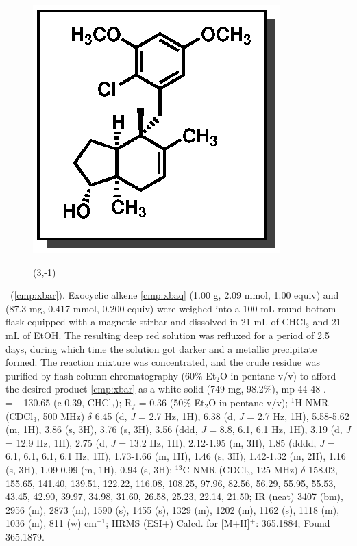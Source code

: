 \vspace{10pt}
\begin{figure}
  \vspace{-25pt}
  \begin{center}
    \includegraphics[scale=0.8]{chp_singlecarbon/images/xbar}
    \begin{textblock}{1}(3,-1)  \end{textblock}
  \end{center}
  \vspace{-30pt}
\end{figure}\noindent \textbf{\CMPxbar}\ (\ref{cmp:xbar}). Exocyclic alkene \ref{cmp:xbaq} (1.00
g, 2.09 mmol, 1.00 equiv) and  (87.3 mg, 0.417 mmol, 0.200 equiv) were
weighed into a 100 mL round bottom flask equipped with a magnetic
stirbar and dissolved in 21 mL of CHCl$_3$ and 21 mL of EtOH. The
resulting deep red solution was refluxed for a period of 2.5 days, during
which time the solution got darker and a metallic precipitate formed. The reaction mixture was
concentrated, and the crude residue was purified by flash column chromatography (60\% Et$_2$O in
pentane v/v) to afford the desired product \ref{cmp:xbar} as a white solid (749 mg, 98.2\%), mp
44-48 \degc. \\
\rotation = $-$130.65 (c 0.39, CHCl$_3$); R$_f$ = 0.36 (50\% Et$_2$O in pentane v/v); $^1$H NMR (CDCl$_3$, 500
MHz) $\delta$ 6.45 (d, \textit{J} = 2.7 Hz, 1H), 6.38 (d, \textit{J} = 2.7 Hz, 1H), 5.58-5.62 (m,
1H), 3.86 (s, 3H), 3.76 (s, 3H), 3.56 (ddd, \textit{J} = 8.8, 6.1, 6.1 Hz, 1H), 3.19 (d, \textit{J} = 12.9 Hz, 1H), 2.75 (d, \textit{J} = 13.2 Hz, 1H),
2.12-1.95 (m, 3H), 1.85 (dddd, \textit{J} = 6.1, 6.1, 6.1, 6.1 Hz, 1H), 1.73-1.66 (m, 1H), 1.46 (s, 3H),
1.42-1.32 (m, 2H), 1.16 (s, 3H), 1.09-0.99 (m, 1H), 0.94 (s, 3H); $^{13}$C NMR (CDCl$_3$, 125
MHz) $\delta$ 158.02, 155.65, 141.40, 139.51, 122.22, 116.08, 108.25, 97.96, 82.56, 56.29, 55.95,
55.53, 43.45, 42.90, 39.97, 34.98, 31.60, 26.58, 25.23, 22.14, 21.50; IR (neat) 3407 (bm), 2956
(m), 2873 (m), 1590 (s), 1455 (s), 1329 (m), 1202 (m), 1162 (s), 1118 (m), 1036 (m), 811 (w)
cm$^{-1}$; HRMS (ESI+) Calcd. for  [M+H]$^+$: 365.1884; Found 365.1879.

